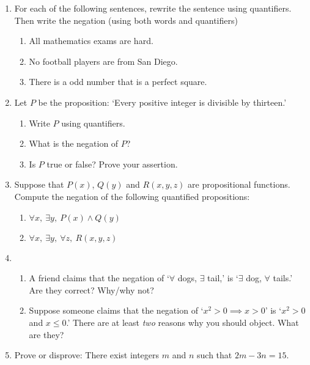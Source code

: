 \begin{exercises}{}{}

\begin{enumerate}\renewcommand{\labelenumi}{\thesubsection.\theenumi}
	\item For each of the following sentences, rewrite the sentence using quantifiers. Then write the negation (using both words and quantifiers)
		\begin{enumerate}
		  \item All mathematics exams are hard.
	  	\item No football players are from San Diego.
	  	\item There is a odd number that is a perfect square.
		\end{enumerate}
		
	\item Let $P$ be the proposition: `Every positive integer is divisible by thirteen.'
    \begin{enumerate}
      \item Write $P$ using quantifiers.
      \item What is the negation of $P$?
      \item Is $P$ true or false? Prove your assertion.
    \end{enumerate}
    
  \item Suppose that $P(x)$, $Q(y)$ and $R(x,y,z)$ are propositional functions. Compute the negation of the following quantified propositions:
  \begin{enumerate}
    \item $\forall x,\ \exists y,\ P(x)\wedge Q(y)$
    \item $\forall x,\ \exists y,\ \forall z,\ R(x,y,z)$
  \end{enumerate}
  
  \item\begin{enumerate}
  	\item A friend claims that the negation of `$\forall$ dogs, $\exists$ tail,' is `$\exists$ dog, $\forall$ tails.' Are they correct? Why/why not?
    \item Suppose someone claims that the negation of `$x^2>0\implies x>0$' is `$x^2>0$ and $x\le 0$.' There are at least \emph{two} reasons why you should object. What are they?
  \end{enumerate} 
		
	\item Prove or disprove: There exist integers $m$ and $n$ such that $2m-3n=15$. 


\end{enumerate}
\end{exercises}
